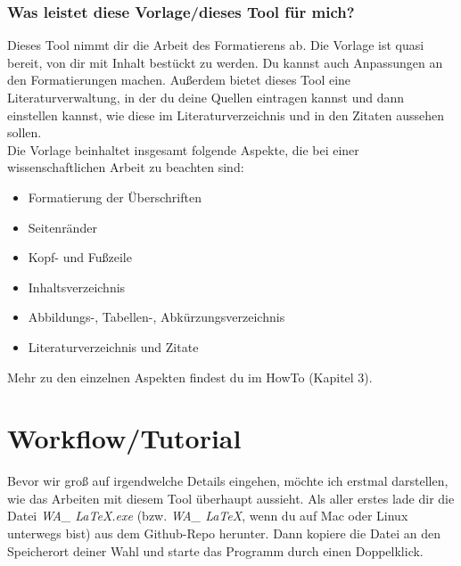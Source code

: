 \documentclass[12pt]{article}
\begin{document}
\section{Was leistet diese Vorlage/dieses Tool für mich?}
Dieses Tool nimmt dir die Arbeit des Formatierens ab. Die Vorlage ist quasi bereit, von dir mit Inhalt bestückt zu werden. Du kannst auch Anpassungen an den Formatierungen machen. Außerdem bietet dieses Tool eine Literaturverwaltung, in der du deine Quellen eintragen kannst und dann einstellen kannst, wie diese im Literaturverzeichnis und in den Zitaten aussehen sollen.\\
Die Vorlage beinhaltet insgesamt folgende Aspekte, die bei einer wissenschaftlichen Arbeit zu beachten sind:
\begin{itemize}
\item Formatierung der Überschriften
\item Seitenränder
\item Kopf- und Fußzeile
\item Inhaltsverzeichnis
\item Abbildungs-, Tabellen-, Abkürzungsverzeichnis
\item Literaturverzeichnis und Zitate
\end{itemize}
Mehr zu den einzelnen Aspekten findest du im HowTo (Kapitel 3).

\part{Workflow/Tutorial}
Bevor wir groß auf irgendwelche Details eingehen, möchte ich erstmal darstellen, wie das Arbeiten mit diesem Tool überhaupt aussieht. Als aller erstes lade dir die Datei \textit{WA\_ LaTeX.exe} (bzw. \textit{WA\_ LaTeX}, wenn du auf Mac oder Linux unterwegs bist) aus dem Github-Repo herunter. Dann kopiere die Datei an den Speicherort deiner Wahl und starte das Programm durch einen Doppelklick.
\end{document}
